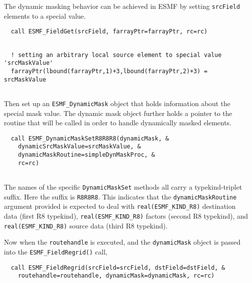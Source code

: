    The dynamic masking behavior can be achieved in ESMF by setting {\tt srcField}
   elements to a special value. 

 \begin{verbatim}
  call ESMF_FieldGet(srcField, farrayPtr=farrayPtr, rc=rc)
 
\end{verbatim}
 

 \begin{verbatim}
  ! setting an arbitrary local source element to special value 'srcMaskValue'
  farrayPtr(lbound(farrayPtr,1)+3,lbound(farrayPtr,2)+3) = srcMaskValue
 
\end{verbatim}
 

   Then set up an {\tt ESMF\_DynamicMask} object that holds information about
   the special mask value. The dynamic mask object
   further holds a pointer to the routine that will be called in order to handle
   dynamically masked elements. 

 \begin{verbatim}
  call ESMF_DynamicMaskSetR8R8R8(dynamicMask, &
    dynamicSrcMaskValue=srcMaskValue, &
    dynamicMaskRoutine=simpleDynMaskProc, &
    rc=rc)
 
\end{verbatim}
 

   The names of the specific {\tt DynamicMaskSet} methods all carry a 
   typekind-triplet suffix. Here the suffix is {\tt R8R8R8}. 
   This indicates that the {\tt dynamicMaskRoutine} argument
   provided is expected to deal with {\tt real(ESMF\_KIND\_R8)} destination data
   (first R8 typekind), {\tt real(ESMF\_KIND\_R8)} factors (second R8 typekind),
   and {\tt real(ESMF\_KIND\_R8)} source data (third R8 typekind).
  
   Now when the {\tt routehandle} is executed, and the {\tt dynamicMask} object
   is passed into the {\tt ESMF\_FieldRegrid()} call, 

 \begin{verbatim}
  call ESMF_FieldRegrid(srcField=srcField, dstField=dstField, &
    routehandle=routehandle, dynamicMask=dynamicMask, rc=rc)
 
\end{verbatim}
 
